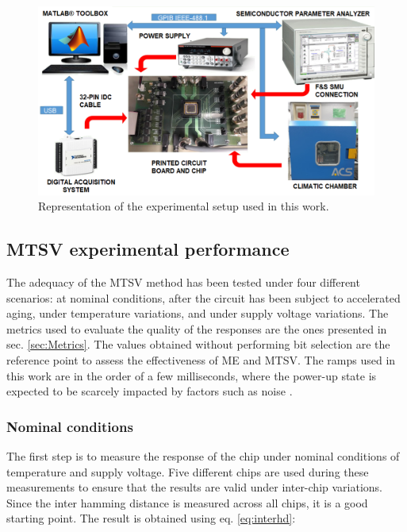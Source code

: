 \begin{figure}[t]
    \centering
    \includegraphics[width=14cm]{images/experimental_setup.png}
    \caption{Representation of the experimental setup used in this work.}
    \label{fig:expsetup}
\end{figure}

\subsection{MTSV experimental performance}

The adequacy of the MTSV method has been tested under four different scenarios: at nominal conditions, after the circuit has been subject to accelerated aging, under temperature variations, and under supply voltage variations. The metrics used to evaluate the quality of the responses are the ones presented in sec. \ref{sec:Metrics}. The values obtained without performing bit selection are the reference point to assess the effectiveness of ME and MTSV. The ramps used in this work are in the order of a few milliseconds, where the power-up state is expected to be scarcely impacted by factors such as noise \cite{Wang2018}. 

\subsubsection{Nominal conditions}

The first step is to measure the response of the chip under nominal conditions of temperature and supply voltage. Five different chips are used during these measurements to ensure that the results are valid under inter-chip variations. Since the inter hamming distance is measured across all chips, it is a good starting point. The result is obtained using eq. \ref{eq:interhd}:

